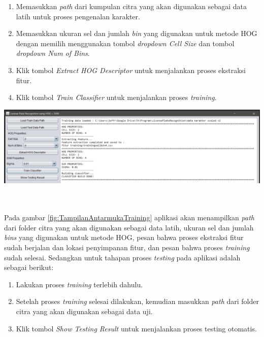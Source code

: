 \begin{enumerate}
\item Memasukkan \textit{path} dari kumpulan citra yang akan digunakan sebagai data latih untuk proses pengenalan karakter.
\item Memasukkan ukuran sel dan jumlah \textit{bin} yang digunakan untuk metode HOG dengan memilih menggunakan tombol \textit{dropdown Cell Size} dan tombol \textit{dropdown Num of Bins}.
\item Klik tombol \textit{Extract HOG Descriptor} untuk menjalankan proses ekstraksi fitur.
\item Klik tombol \textit{Train Classifier} untuk menjalankan proses \textit{training}.
\end{enumerate}
\begin{adjustbox}{width=1\textwidth}
	\noindent\begin{minipage}{\linewidth}
		\centering\includegraphics[width=16cm]{images/TampilanAntarmukaTraining.png}
		\label{fig:TampilanAntarmukaTraining}
	\end{minipage}
\end{adjustbox}\\
\\
\noindent Pada gambar \ref{fig:TampilanAntarmukaTraining} aplikasi akan menampilkan \textit{path} dari folder citra yang akan digunakan sebagai data latih, ukuran sel dan jumlah \textit{bins} yang digunakan untuk metode HOG, pesan bahwa proses ekstraksi fitur sudah berjalan dan lokasi penyimpanan fitur, dan pesan bahwa proses \textit{training} sudah selesai.
\noindent Sedangkan untuk tahapan proses \textit{testing} pada aplikasi adalah sebagai berikut:
\begin{enumerate}
\item Lakukan proses \textit{training} terlebih dahulu.
\item Setelah proses \textit{training} selesai dilakukan, kemudian masukkan \textit{path} dari folder citra yang akan digunakan sebagai data uji.
\item Klik tombol \textit{Show Testing Result} untuk menjalankan proses testing otomatis.
\end{enumerate}
